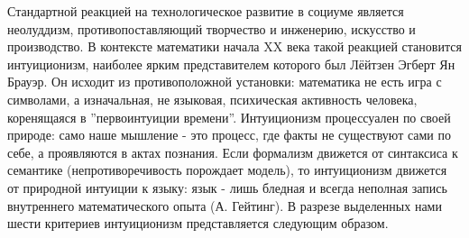 \documentclass[12pt]{article}
\begin{document}
Стандартной реакцией на технологическое развитие в социуме является неолуддизм, противопоставляющий творчество и инженерию, искусство и производство. В контексте математики начала XX века такой реакцией становится интуиционизм, наиболее ярким представителем которого был Лёйтзен Эгберт Ян Брауэр. Он исходит из противоположной установки: математика не есть игра с символами, а изначальная, не языковая, психическая активность человека, коренящаяся в ''первоинтуиции времени''. Интуиционизм процессуален по своей природе: само наше мышление - это процесс, где факты не существуют сами по себе, а проявляются в актах познания. Если формализм движется от синтаксиса к семантике (непротиворечивость порождает модель), то интуиционизм движется от природной интуиции к языку: язык - лишь бледная и всегда неполная запись внутреннего математического опыта (А. Гейтинг). В разрезе выделенных нами шести критериев интуиционизм представляется следующим образом.
\end{document}
